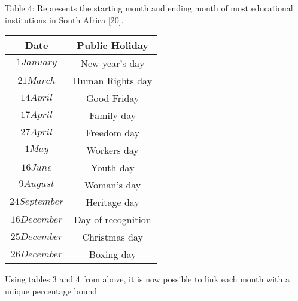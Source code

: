\documentclass{article}
\begin{document}
\begin {center}
Table 4: {Represents the starting month and ending month of most educational institutions in South Africa [20].}

\end {center}
\begin{center}
\begin {tabular}{|c|c|}
\hline

Date& Public Holiday \\ [0.5ex]
\hline

 $1 January$&New year’s day\\
  $21 March$&Human Rights day\\
   $14 April$&Good Friday\\
    $17 April$&Family day\\
     $27 April$&Freedom day\\
      $1 May$&Workers day\\
       $16 June$&Youth day\\
        $9 August$&Woman’s day\\
         $24 September$&Heritage day\\
          $16 December$&Day of recognition\\
            $25 December$&Christmas day\\
              $26 December$&Boxing day\\
\hline

\end {tabular}

\end {center}
Using tables 3 and 4 from above, it is now possible to link each month with a unique percentage bound
\end{document}
